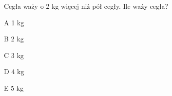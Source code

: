 \begin{tresc}
Cegła waży o 2 kg więcej niż pół cegły. Ile waży cegła?
\end{tresc}
\begin{wariant}{A} 1 kg \end{wariant}
\begin{wariant}{B} 2 kg \end{wariant}
\begin{wariant}{C} 3 kg \end{wariant}
\begin{wariant}{D} 4 kg \end{wariant}
\begin{wariant}{E} 5 kg \end{wariant}
